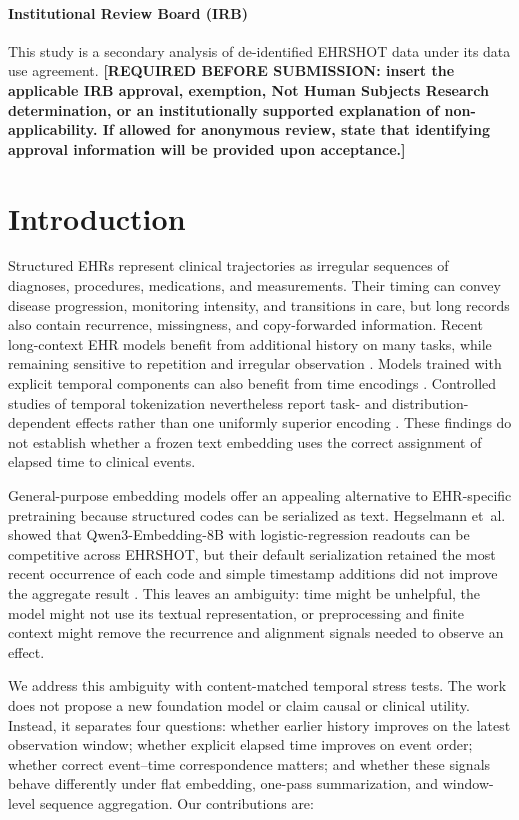 \documentclass[pmlr,twocolumn,10pt]{jmlr}
\begin{document}
\paragraph*{Institutional Review Board (IRB)}
This study is a secondary analysis of de-identified EHRSHOT data under its data
use agreement. \textbf{[REQUIRED BEFORE SUBMISSION: insert the applicable IRB
approval, exemption, Not Human Subjects Research determination, or an
institutionally supported explanation of non-applicability. If allowed for
anonymous review, state that identifying approval information will be provided
upon acceptance.]}

\section{Introduction}
\label{sec:introduction}

Structured EHRs represent clinical trajectories as irregular sequences of
diagnoses, procedures, medications, and measurements. Their timing can convey
disease progression, monitoring intensity, and transitions in care, but long
records also contain recurrence, missingness, and copy-forwarded information.
Recent long-context EHR models benefit from additional history on many tasks,
while remaining sensitive to repetition and irregular observation
\citep{wornow2025context}. Models trained with explicit temporal components can
also benefit from time encodings \citep{pang2021cehrbert}. Controlled studies of
temporal tokenization nevertheless report task- and distribution-dependent
effects rather than one uniformly superior encoding
\citep{alattrach2025tokenization,liu2025temporal}. These findings do not
establish whether a frozen text embedding uses the correct assignment of
elapsed time to clinical events.

General-purpose embedding models offer an appealing alternative to EHR-specific
pretraining because structured codes can be serialized as text. Hegselmann
et~al. showed that Qwen3-Embedding-8B with logistic-regression readouts can be
competitive across EHRSHOT, but their default serialization retained the most
recent occurrence of each code and simple timestamp additions did not improve
the aggregate result \citep{hegselmann2026llm}. This leaves an ambiguity: time
might be unhelpful, the model might not use its textual representation, or
preprocessing and finite context might remove the recurrence and alignment
signals needed to observe an effect.

We address this ambiguity with content-matched temporal stress tests. The work
does not propose a new foundation model or claim causal or clinical utility.
Instead, it separates four questions: whether earlier history improves on the
latest observation window; whether explicit elapsed time improves on event
order; whether correct event--time correspondence matters; and whether these
signals behave differently under flat embedding, one-pass summarization, and
window-level sequence aggregation. Our contributions are:
\end{document}

